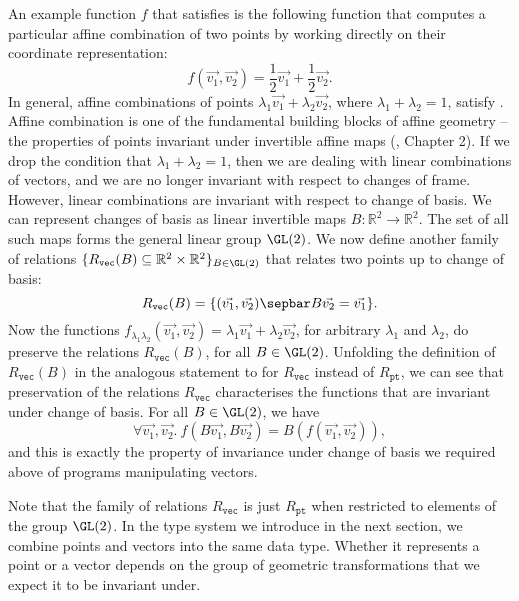 An example function $f$ that satisfies
 is the following function that
computes a particular affine combination of two points by working
directly on their coordinate representation:
\begin{displaymath}
  f(\vec{v_1}, \vec{v_2}) = \frac{1}{2}\vec{v_1} + \frac{1}{2}\vec{v_2}.
\end{displaymath}
In general, affine combinations of points $\lambda_1\vec{v_1} +
\lambda_2\vec{v_2}$, where $\lambda_1 + \lambda_2 = 1$, satisfy
. Affine combination is one of the
fundamental building blocks of affine geometry -- the properties of
points invariant under invertible affine maps
(\cite{gallier11geometric}, Chapter 2). If we drop the condition that
$\lambda_1 + \lambda_2 = 1$, then we are dealing with linear
combinations of vectors, and we are no longer invariant with respect
to changes of frame. However, linear combinations are invariant with
respect to change of basis. We can represent changes of basis as
linear invertible maps $B : \mathbb{R}^2 \to \mathbb{R}^2$. The set of
all such maps forms the general linear group $\GL(2)$. We now define
another family of relations $\{R_{\texttt{vec}}(B) \subseteq
\mathbb{R}^2 \times \mathbb{R}^2 \}_{B \in \GL(2)}$ that relates two
points up to change of basis:
\begin{displaymath}
  R_{\texttt{vec}}(B) = \{ (\vec{v_1},\vec{v_2}) \sepbar B\vec{v_2} = \vec{v_1} \}.
\end{displaymath}
Now the functions $f_{\lambda_1\lambda_2}(\vec{v_1},\vec{v_2}) =
\lambda_1\vec{v_1} + \lambda_2\vec{v_2}$, for arbitrary $\lambda_1$
and $\lambda_2$, do preserve the relations $R_{\texttt{vec}}(B)$, for
all $B \in \GL(2)$. Unfolding the definition of $R_{\texttt{vec}}(B)$
in the analogous statement to 
for $R_{\texttt{vec}}$ instead of $R_{\texttt{pt}}$, we can see that
preservation of the relations $R_{\texttt{vec}}$ characterises the
functions that are invariant under change of basis. For all $B \in \GL(2)$, we have
\begin{displaymath}
  \forall \vec{v_1}, \vec{v_2}.\ f(B\vec{v_1},B\vec{v_2}) = B(f(\vec{v_1},\vec{v_2})),
\end{displaymath}
and this is exactly the property of invariance under change of basis
we required above of programs manipulating vectors.

Note that the family of relations $R_{\texttt{vec}}$ is just
$R_{\texttt{pt}}$ when restricted to elements of the group
$\GL(2)$. In the type system we introduce in the next section, we
combine points and vectors into the same data type. Whether it
represents a point or a vector depends on the group of geometric
transformations that we expect it to be invariant under.

